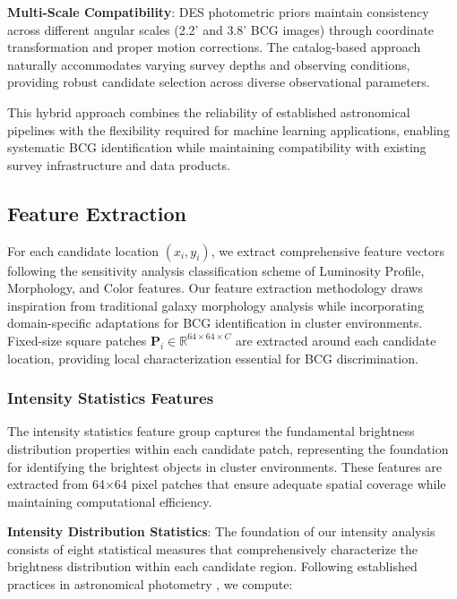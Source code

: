 \documentclass[twocolumn,10pt]{aastex631}
\begin{document}
\textbf{Multi-Scale Compatibility}: DES photometric priors maintain consistency across different angular scales (2.2' and 3.8' BCG images) through coordinate transformation and proper motion corrections. The catalog-based approach naturally accommodates varying survey depths and observing conditions, providing robust candidate selection across diverse observational parameters.

This hybrid approach combines the reliability of established astronomical pipelines with the flexibility required for machine learning applications, enabling systematic BCG identification while maintaining compatibility with existing survey infrastructure and data products.

\subsection{Feature Extraction}

For each candidate location $(x_i, y_i)$, we extract comprehensive feature vectors following the sensitivity analysis classification scheme of Luminosity Profile, Morphology, and Color features. Our feature extraction methodology draws inspiration from traditional galaxy morphology analysis \citep{Conselice2003} while incorporating domain-specific adaptations for BCG identification in cluster environments. Fixed-size square patches $\mathbf{P}_i \in \mathbb{R}^{64 \times 64 \times C}$ are extracted around each candidate location, providing local characterization essential for BCG discrimination.

\subsubsection{Intensity Statistics Features}

The intensity statistics feature group captures the fundamental brightness distribution properties within each candidate patch, representing the foundation for identifying the brightest objects in cluster environments. These features are extracted from 64×64 pixel patches that ensure adequate spatial coverage while maintaining computational efficiency.

\textbf{Intensity Distribution Statistics}: The foundation of our intensity analysis consists of eight statistical measures that comprehensively characterize the brightness distribution within each candidate region. Following established practices in astronomical photometry \citep{Bertin1996}, we compute:
\end{document}
